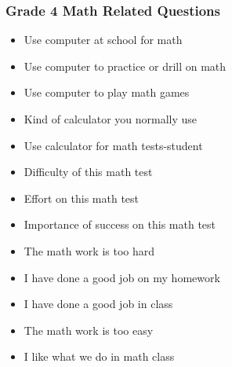 \documentclass[letterpaper,12p,twoside]{article} %
\begin{document}
\begin{singlespace}
\subsubsection{Grade 4 Math Related Questions}
\begin{itemize}
	\item Use computer at school for math
	\item Use computer to practice or drill on math
	\item Use computer to play math games
	\item Kind of calculator you normally use
	\item Use calculator for math tests-student
	\item Difficulty of this math test
	\item Effort on this math test
	\item Importance of success on this math test
	\item The math work is too hard
	\item I have done a good job on my homework
	\item I have done a good job in class
	\item The math work is too easy
	\item I like what we do in math class
\end{itemize}


\end{singlespace}
\end{document}
